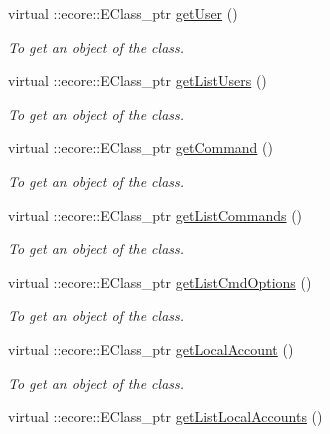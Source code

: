 \begin{DoxyCompactItemize}
virtual ::ecore::EClass\_\-ptr \hyperlink{classUMS__Data_1_1UMS__DataPackage_a2966a92fef51b6ae3c432dbb5864bafa}{getUser} ()
\begin{DoxyCompactList}\small\item\em To get an object of the class. \item\end{DoxyCompactList}\item 
virtual ::ecore::EClass\_\-ptr \hyperlink{classUMS__Data_1_1UMS__DataPackage_aa82bed67ff61f083da0a1b8e6037f57e}{getListUsers} ()
\begin{DoxyCompactList}\small\item\em To get an object of the class. \item\end{DoxyCompactList}\item 
virtual ::ecore::EClass\_\-ptr \hyperlink{classUMS__Data_1_1UMS__DataPackage_af042965be2f809d8a5dbb7ef51b58200}{getCommand} ()
\begin{DoxyCompactList}\small\item\em To get an object of the class. \item\end{DoxyCompactList}\item 
virtual ::ecore::EClass\_\-ptr \hyperlink{classUMS__Data_1_1UMS__DataPackage_aed7fb47652363d4ff9b7c4262e92876c}{getListCommands} ()
\begin{DoxyCompactList}\small\item\em To get an object of the class. \item\end{DoxyCompactList}\item 
virtual ::ecore::EClass\_\-ptr \hyperlink{classUMS__Data_1_1UMS__DataPackage_ad41633d3468a425df70d4056378b6255}{getListCmdOptions} ()
\begin{DoxyCompactList}\small\item\em To get an object of the class. \item\end{DoxyCompactList}\item 
virtual ::ecore::EClass\_\-ptr \hyperlink{classUMS__Data_1_1UMS__DataPackage_aeda970490829f6dd26cfb204a0adff95}{getLocalAccount} ()
\begin{DoxyCompactList}\small\item\em To get an object of the class. \item\end{DoxyCompactList}\item 
virtual ::ecore::EClass\_\-ptr \hyperlink{classUMS__Data_1_1UMS__DataPackage_a8f851c57ecbf86b96d492c78455801f8}{getListLocalAccounts} ()

\end{DoxyCompactItemize}
